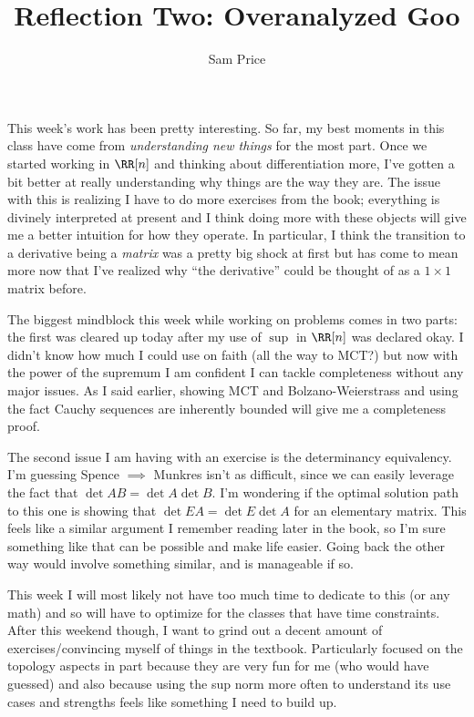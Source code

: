 \documentclass[12pt]{article}
\author{Sam Price}
\date{}
\title{Reflection Two: Overanalyzed Goo}
\begin{document}
\maketitle

This week's work has been pretty interesting.
So far, my best moments in this class have come from \emph{understanding new things} for the most part.
Once we started working in $\RR[n]$ and thinking about differentiation more, I've gotten a bit better at really understanding why things are the way they are.
The issue with this is realizing I have to do more exercises from the book; everything is divinely interpreted at present and I think doing more with these objects
will give me a better intuition for how they operate. In particular, I think the transition to a derivative being a \emph{matrix} was a pretty big shock at first but has come
to mean more now that I've realized why ``the derivative'' could be thought of as a $1 \times 1$ matrix before.

The biggest mindblock this week while working on problems comes in two parts: the first
was cleared up today after my use of $\sup$ in $\RR[n]$ was declared okay.
I didn't know how much I could use on faith (all the way to MCT?) but now with the power
of the supremum I am confident I can tackle completeness without any major issues.
As I said earlier, showing MCT and Bolzano-Weierstrass and using the fact Cauchy sequences are
inherently bounded will give me a completeness proof.

The second issue I am having with an exercise is the determinancy equivalency.
I'm guessing Spence $\implies$ Munkres isn't as difficult, since we can easily leverage
the fact that $\det AB = \det A \det B$. I'm wondering if the optimal solution path to this one
is showing that $\det EA = \det E \det A$ for an elementary matrix.
This feels like a similar argument I remember reading later in the book,
so I'm sure something like that can be possible and make life easier.
Going back the other way would involve something similar, and is manageable if so.

This week I will most likely not have too much time to dedicate to this (or any math)
and so will have to optimize for the classes that have time constraints.
After this weekend though, I want to grind out a decent amount of exercises/convincing myself of things
in the textbook. Particularly focused on the topology aspects in part because they are very fun for me
(who would have guessed) and also because using the sup norm more often to understand its use
cases and strengths feels like something I need to build up.
\end{document}
